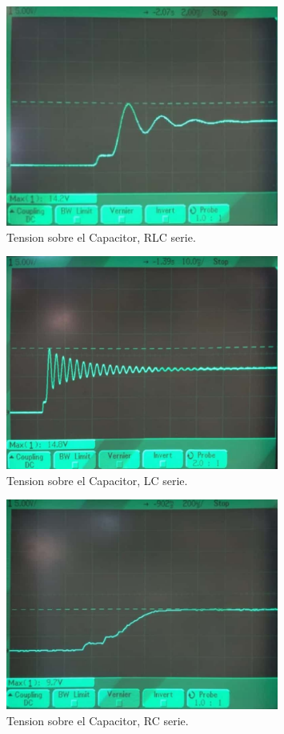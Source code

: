 \documentclass[a4paper]{article}
\begin{document}
\begin{figure}[H]
	\centering
	\includegraphics[width=0.8\textwidth]{carga-rlc.jpeg}
\caption{Tension sobre el Capacitor, RLC serie.}
	\label{fig:carg-rlc}
\end{figure}
\begin{figure}[H]
	\centering
	\includegraphics[width=0.8\textwidth]{carga-rlc-nor.jpeg}
\caption{Tension sobre el Capacitor, LC serie.}
	\label{fig:carg-lc}
\end{figure}
\begin{figure}[H]
	\centering
	\includegraphics[width=0.8\textwidth]{carga-rlc-nol.jpeg}
\caption{Tension sobre el Capacitor, RC serie.}
	\label{fig:carg-rc}
\end{figure}
\end{document}
